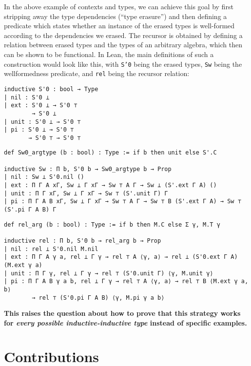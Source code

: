 \documentclass{easychair}
\begin{document}
In the above example of contexts and types, we can achieve this goal by
first stripping away the type dependencies (``type erasure'') and then defining
a predicate which states whether an instance of the erased types is well-formed
according to the dependencies we erased.
The recursor is obtained by defining a relation between erased types and the
types of an arbitrary algebra, which then can be shown to be functional.
In Lean, the main definitions of such a construction would look like this, with
\texttt{S'0} being the erased types, \texttt{Sw} being the wellformedness predicate,
and \texttt{rel} being the recursor relation:
\noindent
\begin{minipage}{.3\textwidth}
\begin{lstlisting}
inductive S'0 : bool → Type
| nil : S'0 ⊥
| ext : S'0 ⊥ → S'0 ⊤
        → S'0 ⊥
| unit : S'0 ⊥ → S'0 ⊤
| pi : S'0 ⊥ → S'0 ⊤
       → S'0 ⊤ → S'0 ⊤
\end{lstlisting}
\end{minipage} \hfill
\begin{minipage}{.68\textwidth}
\begin{lstlisting}
def Sw0_argtype (b : bool) : Type := if b then unit else S'.C

inductive Sw : Π b, S'0 b → Sw0_argtype b → Prop
| nil : Sw ⊥ S'0.nil ()
| ext : Π Γ A xΓ, Sw ⊥ Γ xΓ → Sw ⊤ A Γ → Sw ⊥ (S'.ext Γ A) ()
| unit : Π Γ xΓ, Sw ⊥ Γ xΓ → Sw ⊤ (S'.unit Γ) Γ
| pi : Π Γ A B xΓ, Sw ⊥ Γ xΓ → Sw ⊤ A Γ → Sw ⊤ B (S'.ext Γ A) → Sw ⊤ (S'.pi Γ A B) Γ
\end{lstlisting}
\end{minipage}
\noindent\begin{minipage}{\textwidth}\begin{lstlisting}
def rel_arg (b : bool) : Type := if b then M.C else Σ γ, M.T γ

inductive rel : Π b, S'0 b → rel_arg b → Prop
| nil : rel ⊥ S'0.nil M.nil
| ext : Π Γ A γ a, rel ⊥ Γ γ → rel ⊤ A ⟨γ, a⟩ → rel ⊥ (S'0.ext Γ A) (M.ext γ a)
| unit : Π Γ γ, rel ⊥ Γ γ → rel ⊤ (S'0.unit Γ) ⟨γ, M.unit γ⟩
| pi : Π Γ A B γ a b, rel ⊥ Γ γ → rel ⊤ A ⟨γ, a⟩ → rel ⊤ B ⟨M.ext γ a, b⟩
        → rel ⊤ (S'0.pi Γ A B) ⟨γ, M.pi γ a b⟩
\end{lstlisting}
\end{minipage}
\textbf{This raises the question about how to prove that this strategy works for \emph{every
possible inductive-inductive type} instead of specific examples.}

\section{Contributions}
\end{document}
